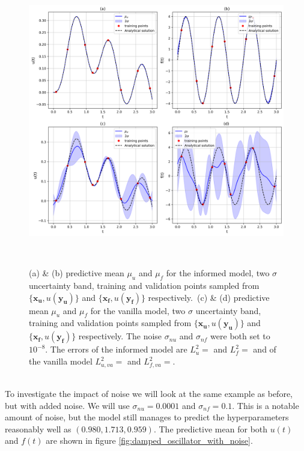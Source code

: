 \documentclass{article}
\begin{document}
\begin{figure}[htbp!]
    \centering
    \includegraphics[width=1\textwidth]{../final_examples/oscillator/merged_1d_plots.png}
    \caption{(a) \& (b) predictive mean $\mu_u$ and $\mu_f$ for the informed model, two $\sigma$ uncertainty band, training and validation points sampled from $\{\bm{x_u},u(\bm{y_u})\}$ and $\{\bm{x_f},u(\bm{y_f})\}$ respectively.\ (c) \& (d) predictive mean $\mu_u$ and $\mu_f$ for the vanilla model, two $\sigma$ uncertainty band, training and validation points sampled from $\{\bm{x_u},u(\bm{y_u})\}$ and $\{\bm{x_f},u(\bm{y_f})\}$ respectively. The noise $\sigma_{nu}$ and $\sigma_{nf}$ were both set to $10^{-8}$. The errors of the informed model are $L^2_u = $ and $L^2_f =$ and of the vanilla model $L^2_{u,va} = $ and $L^2_{f,va} =$.}
    ~\label{fig:damped_oscillator}
\end{figure}
\\
To investigate the impact of noise we will look at the same example as before, but with added noise. We will use $\sigma_{nu} = 0.0001$ and $\sigma_{nf} = 0.1$. This is a notable amount of noise, but the model still manages to predict the hyperparameters reasonably well as $(0.980,1.713,0.959)$. The predictive mean for both $u(t)$ and $f(t)$ are shown in figure \ref{fig:damped_oscillator_with_noise}.
\end{document}
